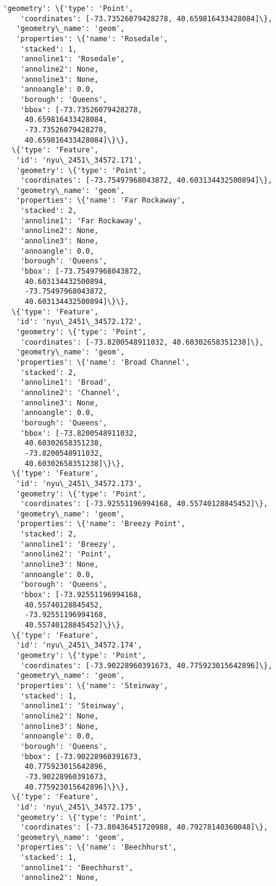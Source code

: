 \documentclass[11pt]{article}
\begin{document}
\begin{tcolorbox}[breakable, size=fbox, boxrule=.5pt, pad at break*=1mm, opacityfill=0]
\begin{Verbatim}[commandchars=\\\{\}]
   'geometry': \{'type': 'Point',
    'coordinates': [-73.73526079428278, 40.659816433428084]\},
   'geometry\_name': 'geom',
   'properties': \{'name': 'Rosedale',
    'stacked': 1,
    'annoline1': 'Rosedale',
    'annoline2': None,
    'annoline3': None,
    'annoangle': 0.0,
    'borough': 'Queens',
    'bbox': [-73.73526079428278,
     40.659816433428084,
     -73.73526079428278,
     40.659816433428084]\}\},
  \{'type': 'Feature',
   'id': 'nyu\_2451\_34572.171',
   'geometry': \{'type': 'Point',
    'coordinates': [-73.75497968043872, 40.603134432500894]\},
   'geometry\_name': 'geom',
   'properties': \{'name': 'Far Rockaway',
    'stacked': 2,
    'annoline1': 'Far Rockaway',
    'annoline2': None,
    'annoline3': None,
    'annoangle': 0.0,
    'borough': 'Queens',
    'bbox': [-73.75497968043872,
     40.603134432500894,
     -73.75497968043872,
     40.603134432500894]\}\},
  \{'type': 'Feature',
   'id': 'nyu\_2451\_34572.172',
   'geometry': \{'type': 'Point',
    'coordinates': [-73.8200548911032, 40.60302658351238]\},
   'geometry\_name': 'geom',
   'properties': \{'name': 'Broad Channel',
    'stacked': 2,
    'annoline1': 'Broad',
    'annoline2': 'Channel',
    'annoline3': None,
    'annoangle': 0.0,
    'borough': 'Queens',
    'bbox': [-73.8200548911032,
     40.60302658351238,
     -73.8200548911032,
     40.60302658351238]\}\},
  \{'type': 'Feature',
   'id': 'nyu\_2451\_34572.173',
   'geometry': \{'type': 'Point',
    'coordinates': [-73.92551196994168, 40.55740128845452]\},
   'geometry\_name': 'geom',
   'properties': \{'name': 'Breezy Point',
    'stacked': 2,
    'annoline1': 'Breezy',
    'annoline2': 'Point',
    'annoline3': None,
    'annoangle': 0.0,
    'borough': 'Queens',
    'bbox': [-73.92551196994168,
     40.55740128845452,
     -73.92551196994168,
     40.55740128845452]\}\},
  \{'type': 'Feature',
   'id': 'nyu\_2451\_34572.174',
   'geometry': \{'type': 'Point',
    'coordinates': [-73.90228960391673, 40.775923015642896]\},
   'geometry\_name': 'geom',
   'properties': \{'name': 'Steinway',
    'stacked': 1,
    'annoline1': 'Steinway',
    'annoline2': None,
    'annoline3': None,
    'annoangle': 0.0,
    'borough': 'Queens',
    'bbox': [-73.90228960391673,
     40.775923015642896,
     -73.90228960391673,
     40.775923015642896]\}\},
  \{'type': 'Feature',
   'id': 'nyu\_2451\_34572.175',
   'geometry': \{'type': 'Point',
    'coordinates': [-73.80436451720988, 40.79278140360048]\},
   'geometry\_name': 'geom',
   'properties': \{'name': 'Beechhurst',
    'stacked': 1,
    'annoline1': 'Beechhurst',
    'annoline2': None,

\end{Verbatim}
\end{tcolorbox}
\end{document}
